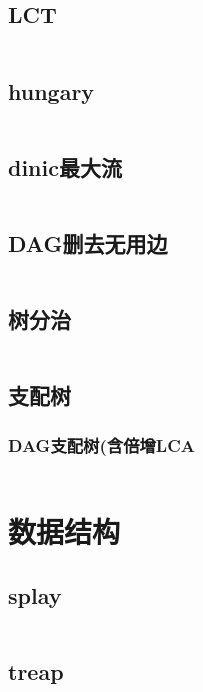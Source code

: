 \documentclass{article}
\begin{document}
\subsection{LCT} %
\inputminted[breaklines]{c++}{../图论/LCT.cpp} %

\subsection{hungary} %
\inputminted[breaklines]{c++}{../图论/hungary.cpp} %

\subsection{dinic最大流} %
\inputminted[breaklines]{c++}{../图论/dinic最大流.cpp} %

\subsection{DAG删去无用边} %
\inputminted[breaklines]{c++}{../图论/DAG删去无用边.cpp} %

\subsection{树分治} %
\inputminted[breaklines]{c++}{../图论/树分治.cpp} %

\subsection{支配树}
\subsubsection{DAG支配树(含倍增LCA}
\inputminted[breaklines]{c++}{../图论/DAG支配树.cpp}

\newpage
\section{数据结构}
\subsection{splay}
\inputminted[breaklines]{c++}{../数据结构/splay.cpp}

\subsection{treap}
\inputminted[breaklines]{c++}{../数据结构/treap.cpp}
\end{document}
